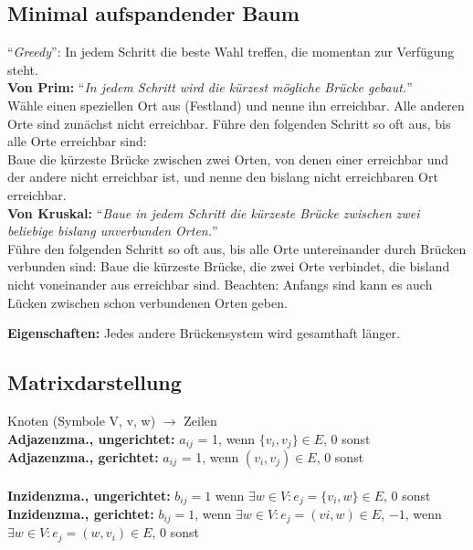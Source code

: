 \documentclass[8pt,landscape]{scrartcl}
\begin{document}
\begin{multicols}{3}
\subsection{Minimal aufspandender Baum}

``\textit{Greedy}'': In jedem Schritt die beste Wahl treffen, die momentan zur Verf\"ugung steht.\\

\textbf{Von Prim:} ``\textit{In jedem Schritt wird die k\"urzest m\"ogliche Br\"ucke gebaut.}''\\
W\"ahle einen speziellen Ort aus (Festland) und nenne ihn erreichbar.
Alle anderen Orte sind zun\"achst nicht erreichbar.
F\"uhre den folgenden Schritt so oft aus, bis alle Orte erreichbar sind:\\
Baue die k\"urzeste Br\"ucke zwischen zwei Orten, von denen einer erreichbar und der andere nicht erreichbar ist, und nenne den bislang nicht erreichbaren Ort erreichbar.\\

\textbf{Von Kruskal:} ``\textit{Baue in jedem Schritt die k\"urzeste Br\"ucke zwischen zwei beliebige bislang unverbunden Orten.}''\\
F\"uhre den folgenden Schritt so oft aus, bis alle Orte untereinander durch Br\"ucken verbunden sind: Baue die k\"urzeste Br\"ucke, die zwei Orte verbindet, die bisland nicht voneinander aus erreichbar sind.
Beachten: Anfangs sind kann es auch L\"ucken zwischen schon verbundenen Orten geben.

\textbf{Eigenschaften:} Jedes andere Br\"uckensystem wird gesamthaft l\"anger.



\subsection{Matrixdarstellung}
Knoten (Symbole V, v, w) $\rightarrow$ Zeilen\\
\textbf{Adjazenzma., ungerichtet:} $a_{ij}$ = 1, wenn $\{v_i, v_j\} \in E$, 0 sonst\\
\textbf{Adjazenzma., gerichtet:} $a_{ij}$ = 1, wenn $(v_i, v_j) \in E$, 0 sonst\\\\ 
\textbf{Inzidenzma., ungerichtet:} $b_{ij} = 1$ wenn $\exists w \in V: e_j = \{v_i, w \} \in E$, 0 sonst\\
\textbf{Inzidenzma., gerichtet:} $b_{ij} = 1$, wenn $\exists w \in V : e_j = (vi, w) \in E$, $-1$, wenn $\exists w \in V: e_j = (w, v_i) \in E$, 0 sonst


\end{multicols}
\end{document}
